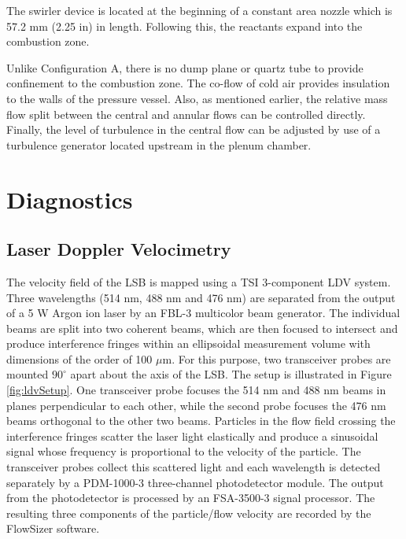 The swirler device is located at the beginning of a constant area nozzle which is 57.2 mm (2.25 in) in length.
Following this, the reactants expand into the combustion zone.

Unlike Configuration A, there is no dump plane or quartz tube to provide confinement to the combustion zone.
The co-flow of cold air provides insulation to the walls of the pressure vessel.
Also, as mentioned earlier, the relative mass flow split between the central and annular flows can be controlled directly.
Finally, the level of turbulence in the central flow can be adjusted by use of a turbulence generator\cite{2011-marshall} located upstream in the plenum chamber.

\section{Diagnostics}
\label{sec:experimental-diagnostics}

\subsection{Laser Doppler Velocimetry}
\label{subsec:experimental-laser-doppler-velocimetry}



The velocity field of the LSB is mapped using a TSI 3-component LDV system.
Three wavelengths (514 nm, 488 nm and 476 nm) are separated from the output of a 5 W Argon ion laser by an FBL-3 multicolor beam generator.
The individual beams are split into two coherent beams, which are then focused to intersect and produce interference fringes within an ellipsoidal measurement volume with dimensions of the order of 100 \(\mu\)m.
For this purpose, two transceiver probes are mounted \(90^\circ\) apart about the axis of the LSB.
The setup is illustrated in Figure \ref{fig:ldvSetup}.
One transceiver probe focuses the 514 nm and 488 nm beams in planes perpendicular to each other, while the second probe focuses the 476 nm beams orthogonal to the other two beams.
Particles in the flow field crossing the interference fringes scatter the laser light elastically and produce a sinusoidal signal whose frequency is proportional to the velocity of the particle.
The transceiver probes collect this scattered light and each wavelength is detected separately by a PDM-1000-3 three-channel photodetector module.
The output from the photodetector is processed by an FSA-3500-3 signal processor.
The resulting three components of the particle/flow velocity are recorded by the FlowSizer software.

